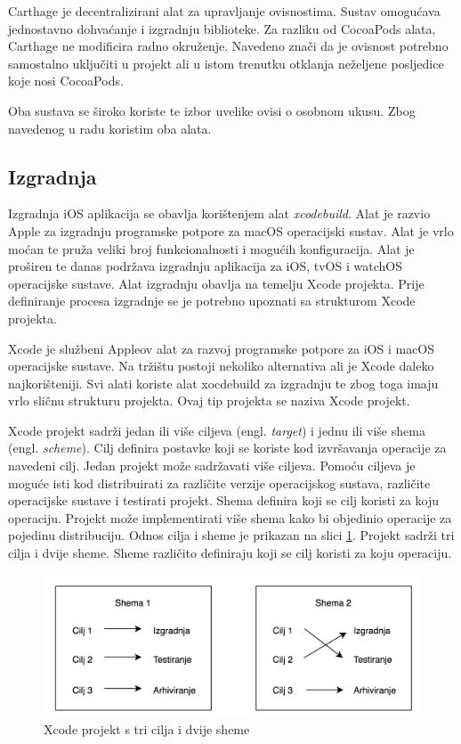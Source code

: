 \documentclass[times, utf8, diplomski, numeric]{fer}
\newcommand{\eng}[1]{(engl. \textit{#1})}
\begin{document}
Carthage je decentralizirani alat za upravljanje ovisnostima. Sustav omogućava jednostavno dohvaćanje i izgradnju biblioteke. Za razliku od CocoaPods alata, Carthage ne modificira radno okruženje. Navedeno znači da je ovisnost potrebno samostalno uključiti u projekt ali u istom trenutku otklanja neželjene posljedice koje nosi CocoaPods.

Oba sustava se široko koriste te izbor uvelike ovisi o osobnom ukusu. Zbog navedenog u radu koristim oba alata.

\subsection{Izgradnja}

Izgradnja iOS aplikacija se obavlja korištenjem alat \textit{xcodebuild}\citep{xcodebuild}. Alat je razvio Apple za izgradnju programske potpore za macOS operacijski sustav. Alat je vrlo moćan te pruža veliki broj funkcionalnosti i mogućih konfiguracija. Alat je proširen te danas podržava izgradnju aplikacija za iOS, tvOS i watchOS operacijske sustave. Alat izgradnju obavlja na temelju Xcode projekta. Prije definiranje procesa izgradnje se je potrebno upoznati sa strukturom Xcode projekta.

Xcode je službeni Appleov alat za razvoj programske potpore za iOS i macOS operacijske sustave. Na tržištu postoji nekoliko alternativa ali je Xcode daleko najkorišteniji. Svi alati koriste alat xocdebuild za izgradnju te zbog toga imaju vrlo sličnu strukturu projekta. Ovaj tip projekta se naziva Xcode projekt.

Xcode projekt sadrži jedan ili više ciljeva \eng{target} i jednu ili više shema \eng{scheme}. Cilj definira postavke koji se koriste kod izvršavanja operacije za navedeni cilj.  Jedan projekt može sadržavati više ciljeva. Pomoću ciljeva je moguće isti kod distribuirati za različite verzije operacijskog sustava, različite operacijske sustave i testirati projekt. Shema definira koji se cilj koristi za koju operaciju. Projekt može implementirati više shema kako bi objedinio operacije za pojedinu distribuciju. Odnos cilja i sheme je prikazan na slici \ref{fig:TargetScheme}. Projekt sadrži tri cilja i dvije sheme. Sheme različito definiraju koji se cilj koristi za koju operaciju.

\begin{figure}
\centering
\includegraphics[scale=0.5]{TargetScheme}
\caption{Xcode projekt s tri cilja i dvije sheme}
\label{fig:TargetScheme}
\end{figure}
\end{document}
